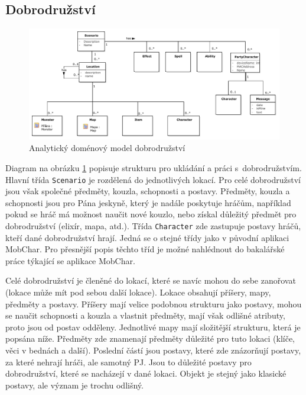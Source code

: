 \documentclass[thesis=B,czech]{resources/FITthesis}[2012/06/26]
\begin{document}
\subsection{Dobrodružství}
\begin{figure}\centering
	\includegraphics[width=1\textwidth]{images/domain_scenario}
	\caption[Analytický doménový model dobrodružství]{Analytický doménový model dobrodružství}\label{fig:dm_scenario}
\end{figure}
Diagram na obrázku \ref{fig:dm_scenario} popisuje strukturu pro ukládání a práci s~dobrodružstvím. Hlavní třída \texttt{Scenario} je rozdělená do jednotlivých lokací. Pro celé dobrodružství jsou však společné předměty, kouzla, schopnosti a postavy. Předměty, kouzla a schopnosti jsou pro Pána jeskyně, který je nadále poskytuje hráčům, například pokud se hráč má možnost naučit nové kouzlo, nebo získal důležitý předmět pro dobrodružství (elixír, mapa, atd.). Třída \texttt{Character} zde zastupuje postavy hráčů, kteří dané dobrodružství hrají. Jedná se o stejné třídy jako v původní aplikaci MobChar. Pro přesnější popis těchto tříd je možné nahlédnout do bakalářské práce týkající se aplikace MobChar\cite{Weberova_2017}.\par

Celé dobrodružství je členěné do lokací, které se navíc mohou do sebe zanořovat (lokace může mít pod sebou další lokace). Lokace obsahují příšery, mapy, předměty a postavy. Příšery mají velice podobnou strukturu jako postavy, mohou se naučit schopnosti a kouzla a vlastnit předměty, mají však odlišné atributy, proto jsou od postav odděleny. Jednotlivé mapy mají složitější strukturu, která je popsána níže. Předměty zde znamenají předměty důležité pro tuto lokaci (klíče, věci v bednách a další). Poslední částí jsou postavy, které zde znázorňují postavy, za které nehrají hráči, ale samotný PJ. Jsou to důležité postavy pro dobrodružství, které se nacházejí v dané lokaci. Objekt je stejný jako klasické postavy, ale význam je trochu odlišný.
\end{document}
